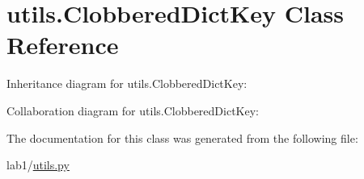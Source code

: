 \hypertarget{classutils_1_1_clobbered_dict_key}{}\section{utils.\+Clobbered\+Dict\+Key Class Reference}
\label{classutils_1_1_clobbered_dict_key}


Inheritance diagram for utils.\+Clobbered\+Dict\+Key\+:


Collaboration diagram for utils.\+Clobbered\+Dict\+Key\+:


The documentation for this class was generated from the following file\+:\begin{DoxyCompactItemize}
\item 
lab1/\hyperlink{utils_8py}{utils.\+py}\end{DoxyCompactItemize}
